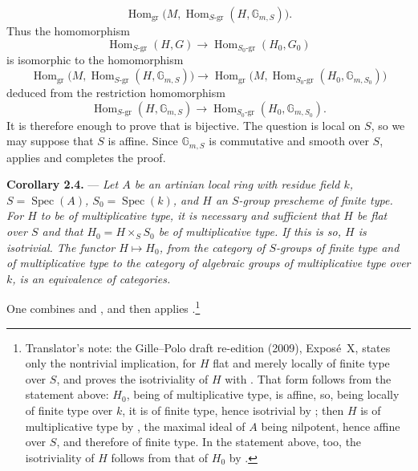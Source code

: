 \[
  \operatorname{Hom}_{\mathrm{gr}}
  \bigl(M,
    \operatorname{Hom}_{S\text{-}\mathrm{gr}}
      (H,\mathbb G_{m,S})\bigr).
\]
Thus the homomorphism
\begin{equation}
  \operatorname{Hom}_{S\text{-}\mathrm{gr}}(H,G)
  \longrightarrow
  \operatorname{Hom}_{S_0\text{-}\mathrm{gr}}(H_0,G_0)
  \tag{x}\label{sga3:x:corollary:2-3:equation:x}
\end{equation}
is isomorphic to the homomorphism
\[
  \operatorname{Hom}_{\mathrm{gr}}
  \bigl(M,\operatorname{Hom}_{S\text{-}\mathrm{gr}}
    (H,\mathbb G_{m,S})\bigr)
  \longrightarrow
  \operatorname{Hom}_{\mathrm{gr}}
  \bigl(M,\operatorname{Hom}_{S_0\text{-}\mathrm{gr}}
    (H_0,\mathbb G_{m,S_0})\bigr)
\]
deduced from the restriction homomorphism
\begin{equation}
  \operatorname{Hom}_{S\text{-}\mathrm{gr}}(H,\mathbb G_{m,S})
  \longrightarrow
  \operatorname{Hom}_{S_0\text{-}\mathrm{gr}}
    (H_0,\mathbb G_{m,S_0}).
  \tag{xx}\label{sga3:x:corollary:2-3:equation:xx}
\end{equation}
It is therefore enough to prove that  is bijective. The question
is local on \(S\), so we may suppose that \(S\) is affine. Since
\(\mathbb G_{m,S}\) is commutative and smooth over \(S\), 
applies and completes the proof.

\medskip
\noindent{}%
\textbf{Corollary 2.4.} ---
\textit{Let \(A\) be an artinian local ring with residue field \(k\),
\(S=\operatorname{Spec}(A)\), \(S_0=\operatorname{Spec}(k)\), and \(H\)
an \(S\)-group prescheme of finite type. For \(H\) to be of
multiplicative type, it is necessary and sufficient that \(H\) be flat
over \(S\) and that \(H_0=H\times_S S_0\) be of multiplicative type.
If this is so, \(H\) is isotrivial. The functor \(H\mapsto H_0\), from
the category of \(S\)-groups of finite type and of multiplicative type
to the category of algebraic groups of multiplicative type over \(k\),
is an equivalence of categories.}

One combines  and , and then applies .\footnote{Translator's note: the Gille--Polo draft
re-edition (2009), Expos\'e~X, states only the nontrivial implication,
for \(H\) flat and merely locally of finite type over \(S\), and proves
the isotriviality of \(H\) with . That form follows from the
statement above: \(H_0\), being of multiplicative type, is affine, so,
being locally of finite type over \(k\), it is of finite type, hence
isotrivial by ; then \(H\) is of multiplicative type by
, the maximal ideal of \(A\) being nilpotent, hence affine
over \(S\), and therefore of finite type. In the statement above, too,
the isotriviality of \(H\) follows from that of \(H_0\) by
.}

